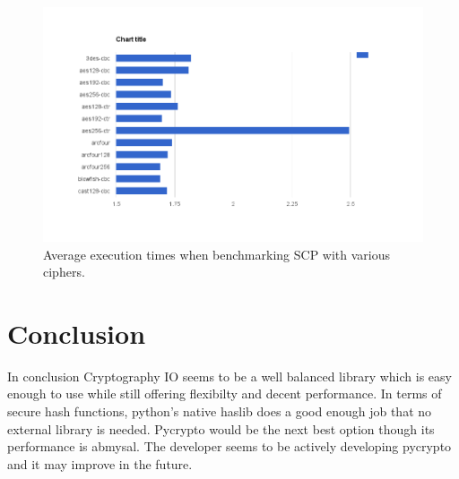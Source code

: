 \documentclass[10pt,conference]{IEEEtran}
\begin{document}
\begin{figure}
\centering
\includegraphics[width=0.7\linewidth]{./scpbench}
\caption{Average execution times when benchmarking SCP with various ciphers.}
\label{fig:scpbench}
\end{figure}



\section{Conclusion}

In conclusion Cryptography IO seems to be a well balanced library which is easy enough to use while still offering flexibilty and decent performance. In terms of secure hash functions, python's native haslib does a good enough job that no external library is needed. Pycrypto would be the next best option though its performance is abmysal. The developer seems to be actively developing pycrypto and it may improve in the future.
\end{document}
